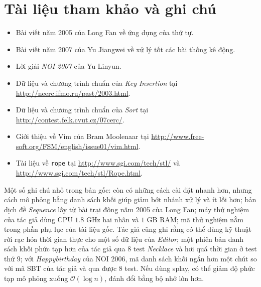 \documentclass[11pt]{article}
\newcommand{\Oh}{\mathcal{O}}
\begin{document}
\section*{Tài liệu tham khảo và ghi chú}

\begin{itemize}
  \item Bài viết năm 2005 của Long Fan về ứng dụng của thứ tự.
  \item Bài viết năm 2007 của Yu Jiangwei về xử lý tốt các bài thống kê động.
  \item Lời giải \textit{NOI 2007} của Yu Linyun.
  \item Dữ liệu và chương trình chuẩn của \textit{Key Insertion} tại
  \url{http://neerc.ifmo.ru/past/2003.html}.
  \item Dữ liệu và chương trình chuẩn của \textit{Sort} tại
  \url{http://contest.felk.cvut.cz/07cerc/}.
  \item Giới thiệu về Vim của Bram Moolenaar tại
  \url{http://www.free-soft.org/FSM/english/issue01/vim.html}.
  \item Tài liệu về \texttt{rope} tại \url{http://www.sgi.com/tech/stl/} và
  \url{http://www.sgi.com/tech/stl/Rope.html}.
\end{itemize}

Một số ghi chú nhỏ trong bản gốc: còn có những cách cài đặt nhanh hơn, nhưng
cách mô phỏng bằng danh sách khối giúp giảm bớt nhánh xử lý và ít lỗi hơn;
bản dịch đề \textit{Sequence} lấy từ bài trại đông năm 2005 của Long Fan;
máy thử nghiệm của tác giả dùng CPU \(1.8\) GHz hai nhân và \(1\) GB RAM; mã
thử nghiệm nằm trong phần phụ lục của tài liệu gốc. Tác giả cũng ghi rằng có
thể dùng kỹ thuật rời rạc hóa thời gian thực cho một số dữ liệu của
\textit{Editor}; một phiên bản danh sách khối phức tạp hơn của tác giả qua
\(8\) test \textit{Necklace} và hơi quá thời gian ở test thứ \(9\); với
\textit{Happybirthday} của NOI 2006, mã danh sách khối ngắn hơn một chút so
với mã SBT của tác giả và qua được \(8\) test. Nếu dùng splay, có thể giảm độ
phức tạp mô phỏng xuống \(\Oh(\log n)\), đánh đổi bằng bộ nhớ lớn hơn.
\end{document}
